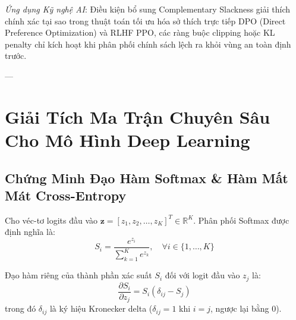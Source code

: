 \textit{Ứng dụng Kỹ nghệ AI}: Điều kiện bổ sung Complementary Slackness giải thích chính xác tại sao trong thuật toán tối ưu hóa sở thích trực tiếp DPO (Direct Preference Optimization) và RLHF PPO, các ràng buộc clipping hoặc KL penalty chỉ kích hoạt khi phân phối chính sách lệch ra khỏi vùng an toàn định trước.

---

\section{Giải Tích Ma Trận Chuyên Sâu Cho Mô Hình Deep Learning}
\label{sec:app-math-matrix-calculus}

\subsection{Chứng Minh Đạo Hàm Softmax \& Hàm Mất Mát Cross-Entropy}

Cho véc-tơ logits đầu vào $\mathbf{z} = [z_1, z_2, \dots, z_K]^T \in \mathbb{R}^K$. Phân phối Softmax được định nghĩa là:
\begin{equation}
S_i = \frac{e^{z_i}}{\sum_{k=1}^K e^{z_k}}, \quad \forall i \in \{1, \dots, K\}
\end{equation}

\begin{theorem}
Đạo hàm riêng của thành phần xác suất $S_i$ đối với logit đầu vào $z_j$ là:
\begin{equation}
\frac{\partial S_i}{\partial z_j} = S_i (\delta_{ij} - S_j)
\end{equation}
trong đó $\delta_{ij}$ là ký hiệu Kronecker delta ($\delta_{ij} = 1$ khi $i = j$, ngược lại bằng 0).
\end{theorem}

